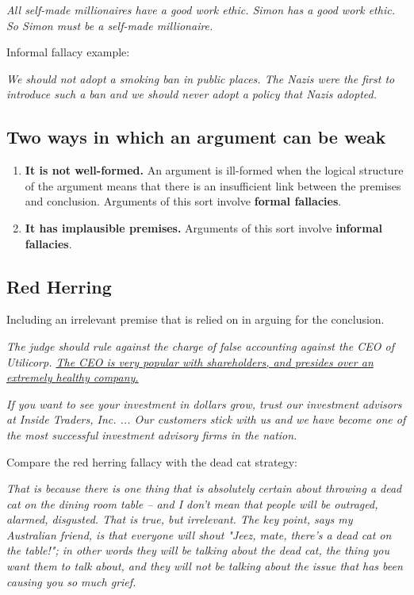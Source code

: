 \textit{All self-made millionaires have a good work ethic. Simon has a good
work ethic. So Simon must be a self-made millionaire.}

Informal fallacy example:

\textit{We should not adopt a smoking ban in public places. The Nazis were
the first to introduce such a ban and we should never adopt a policy that
Nazis adopted.}

\subsection{Two ways in which an argument can be weak}

\begin{enumerate}
    \item \textbf{It is not well-formed.} An argument is ill-formed when the
        logical structure of the argument means that there is an insufficient
        link between the premises and conclusion. Arguments of this sort
        involve \textbf{formal fallacies}.
    \item \textbf{It has implausible premises.} Arguments of this sort involve
        \textbf{informal fallacies}.
\end{enumerate}

\subsection{Red Herring}

Including an irrelevant premise that is relied on in arguing for the
conclusion.

\textit{The judge should rule against the charge of false accounting
against the CEO of Utilicorp. \ul{The CEO is very popular with
shareholders, and presides over an extremely healthy company.}}

\textit{If you want to see your investment in dollars grow, trust our
investment advisors at Inside Traders, Inc. ... Our customers stick with
us and we have become one of the most successful investment advisory
firms in the nation.}

Compare the red herring fallacy with the dead cat strategy:

\textit{That is because there is one thing that is absolutely certain
about throwing a dead cat on the dining room table – and I don't mean that
people will be outraged, alarmed, disgusted. That is true, but irrelevant.
The key point, says my Australian friend, is that everyone will shout
"Jeez, mate, there's a dead cat on the table!"; in other words they will
be talking about the dead cat, the thing you want them to talk about, and
they will not be talking about the issue that has been causing you so much
grief.}

